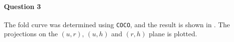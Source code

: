 \documentclass[a4paper,11pt]{article}
\begin{document}
\paragraph{Question 3}\: The fold curve was determined using \texttt{COCO}, and the result is shown in .
The projections on the $(u,r)$, $(u,h)$ and $(r,h)$ plane is plotted.
\begin{figure}[H]
	\centering
\end{figure}
\end{document}
